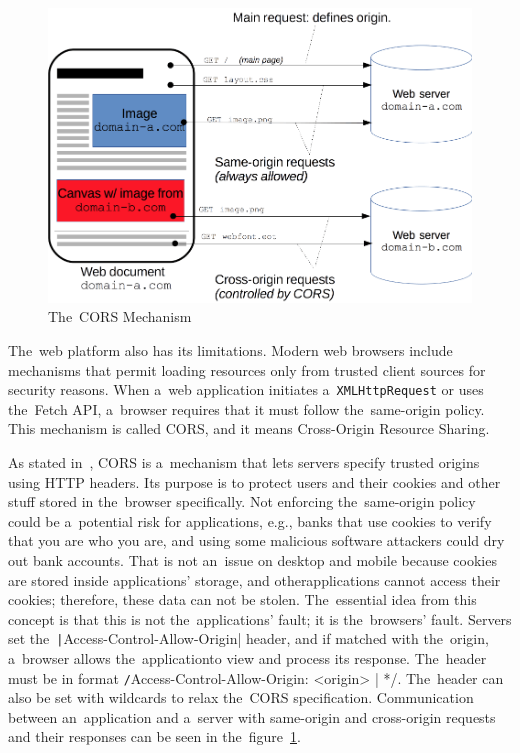\begin{figure}
    \centering
    \includegraphics[width=1\linewidth]{assets/design/cors.png}
    \caption{The~CORS Mechanism~\cite{a2022_crossorigin}}
    \label{fig:design:cors-mechanism}
\end{figure}

The~web platform also has its limitations.
Modern web browsers include mechanisms that permit loading resources only from trusted client sources for security reasons.
When a~web application initiates a~\texttt{XMLHttpRequest} or uses the~Fetch API, a~browser requires that it must follow the~same-origin policy.
This mechanism is called CORS, and it means Cross-Origin Resource Sharing.

As stated in~\cite{a2022_crossorigin}, CORS is a~mechanism that lets servers specify trusted origins using HTTP headers.
Its purpose is to protect users and their cookies and other stuff stored in the~browser specifically.
Not enforcing the~same-origin policy could be a~potential risk for applications, e.g., banks that use cookies to verify that you are who you are, and using some malicious software attackers could dry out bank accounts.
That is not an~issue on desktop and mobile because cookies are stored inside applications' storage, and other\linebreak{}applications cannot access their cookies; therefore, these data can not be stolen.
The~essential idea from this concept is that this is not the~applications' fault; it is the~browsers' fault.
Servers set the~\texttt|Access-Control-Allow-Origin| header, and if matched with the~origin, a~browser allows the~application\linebreak{}to view and process its response. The~header must be in format
\linebreak
\texttt/Access-Control-Allow-Origin: <origin> | */.
The~header can also be set with wildcards to relax the~CORS specification.
Communication between an~application and a~server with same-origin and cross-origin requests and their responses can be seen in the~figure~\ref{fig:design:cors-mechanism}.


